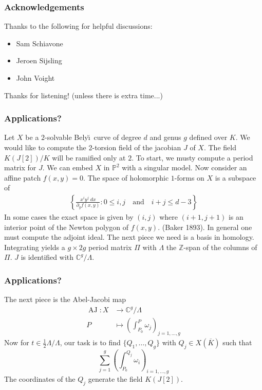 \documentclass[xcolor=dvipsnames]{beamer}
\DeclareMathOperator{\AJ}{AJ}
\theoremstyle{plain}
\newcommand{\CC}{\mathbb C}
\newcommand{\PP}{\mathbb P}
\newcommand{\Z}{\mathbb{Z}}
\newcommand{\Belyi}{Bely\u{\i}}
\begin{document}
  \begin{frame}[plain]
    \frametitle{Acknowledgements}
    Thanks to the following for helpful discussions:
    \begin{itemize}
      \item Sam Schiavone
      \item Jeroen Sijsling
      \item John Voight
    \end{itemize}
    \pause
    Thanks for listening!
    \pause
    (unless there is extra time...)
  \end{frame}
  \begin{frame}[plain]
    \frametitle{Applications?}
    \pause
    Let $X$ be a $2$-solvable \Belyi\ curve of degree $d$
    and genus $g$ defined over $K$.
    \pause
    We would like to compute the 2-torsion field of the jacobian $J$ of $X$.
    \pause
    The field $K(J[2])/K$ will be ramified only at $2$.
    \pause
    To start, we musty compute a period matrix for $J$.
    \pause
    We can embed $X$ in $\PP^2$ with a singular model.
    \pause
    Now consider an affine patch $f(x,y) = 0$.
    \pause
    The space of holomorphic $1$-forms on $X$
    is a subspace of
    \begin{align*}
      \left\{
        \frac{x^iy^j\;dx}{\partial_y f(x,y)} : 0\leq i,j\quad\text{and}\quad i+j\leq d-3
      \right\}
    \end{align*}
    \pause
    In some cases
    the exact space is given by $(i,j)$ where $(i+1,j+1)$
    is an interior point of the Newton polygon of $f(x,y)$.
    \pause
    (Baker 1893).
    \pause
    In general one must compute the adjoint ideal.
    \pause
    The next piece we need is a basis in homology.
    \pause
    Integrating yields a $g\times 2g$ period matrix $\Pi$
    \pause
    with $\Lambda$ the $\Z$-span of the columns of $\Pi$.
    \pause
    $J$ is identified with $\CC^g/\Lambda$.
  \end{frame}
  \begin{frame}[plain]
    \frametitle{Applications?}
    \pause
    The next piece is the Abel-Jacobi map
    \pause
    \begin{align*}
      \AJ:X&\to\CC^g/\Lambda\\
      P&\mapsto\left(\int_{P_0}^P\omega_j\right)_{j=1,\dots,g}
    \end{align*}
    \pause
    Now for $t\in\frac{1}{2}\Lambda/\Lambda$,
    \pause
    our task is to find $\{Q_1,\dots,Q_g\}$ with $Q_j\in X(\overline{K})$
    such that
    \pause
    \[
      \sum_{j=1}^g\left(\int_{P_0}^{Q_j}\omega_i\right)_{i=1,\dots,g}
    \]
    \pause
    The coordinates of the $Q_j$ generate the field $K(J[2])$.
  \end{frame}
\end{document}
